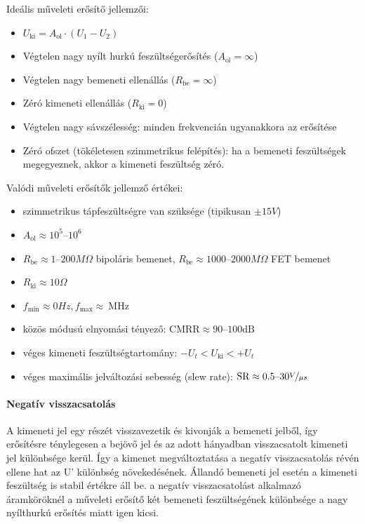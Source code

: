Ideális műveleti erősítő jellemzői:
\begin{itemize}
	\item $U_\text{ki} =A_\text{ol} \cdot (U_1 - U_2)$
	\item Végtelen nagy nyílt hurkú feszültségerősítés ($A_\text{ol} = \infty$)
	\item Végtelen nagy bemeneti ellenállás ($R_\text{be} = \infty$)
	\item Zéró kimeneti ellenállás ($R_\text{ki} = 0$)
	\item Végtelen nagy sávszélesség: minden frekvencián ugyanakkora az erősítése
	\item Zéró ofszet (tökéletesen szimmetrikus felépítés): ha a bemeneti feszültségek megegyeznek, akkor a kimeneti feszültség zéró.
\end{itemize}

Valódi műveleti erősítők jellemző értékei:
\begin{itemize}
	\item szimmetrikus tápfeszültségre van szüksége (tipikusan $\pm 15V$)
	\item $A_\text{ol} \approx 10^5 \text{--} 10^6$
	\item $R_\text{be} \approx 1 \text{--} 200 M\Omega$ bipoláris bemenet, $R_\text{be} \approx 1000 \text{--} 2000 M\Omega$ FET bemenet
	\item $R_\text{ki} \approx 10 \Omega$
	\item $f_\text{min} \approx 0 Hz, f_\text{max} \approx ~\text{MHz}$
	\item közös módusú elnyomási tényező: $\text{CMRR} \approx 90 \text{--} 100 \text{dB}$
	\item véges kimeneti feszültségtartomány: $-U_t < U_\text{ki} < +U_t$
	\item véges maximális jelváltozási sebesség (slew rate): $\text{SR} \approx 0.5 \text{--} 30 \nicefrac{V}{\mu s}$
\end{itemize}

\paragraph{Negatív visszacsatolás} A kimeneti jel egy részét visszavezetik és kivonják a bemeneti jelből, így erősítésre ténylegesen a bejövő jel és az adott hányadban visszacsatolt kimeneti jel különbsége kerül. Így a kimenet megváltoztatása a negatív visszacsatolás révén ellene hat az U’ különbség növekedésének. Állandó bemeneti jel esetén a kimeneti feszültség is stabil értékre áll be. a negatív visszacsatolást alkalmazó áramköröknél a műveleti erősítő két bemeneti feszültségének különbsége a nagy nyílthurkú erősítés miatt igen kicsi.

